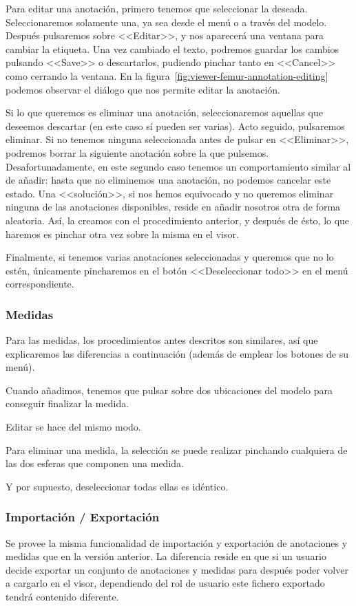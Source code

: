 Para editar una anotación, primero tenemos que seleccionar la deseada. Seleccionaremos solamente una, ya sea desde el menú o a través del modelo. Después pulsaremos sobre <<Editar>>, y nos aparecerá una ventana para cambiar la etiqueta. Una vez cambiado el texto, podremos guardar los cambios pulsando <<Save>> o descartarlos, pudiendo pinchar tanto en <<Cancel>> como cerrando la ventana.
En la figura~\ref{fig:viewer-femur-annotation-editing} podemos observar el diálogo que nos permite editar la anotación.

Si lo que queremos es eliminar una anotación, seleccionaremos aquellas que deseemos descartar (en este caso sí pueden ser varias). Acto seguido, pulsaremos eliminar. Si no tenemos ninguna seleccionada antes de pulsar en <<Eliminar>>, podremos borrar la siguiente anotación sobre la que pulsemos. Desafortunadamente, en este segundo caso tenemos un comportamiento similar al de añadir: hasta que no eliminemos una anotación, no podemos cancelar este estado. Una <<solución>>, si nos hemos equivocado y no queremos eliminar ninguna de las anotaciones disponibles, reside en añadir nosotros otra de forma aleatoria. Así, la creamos con el procedimiento anterior, y después de ésto, lo que haremos es pinchar otra vez sobre la misma en el visor.

Finalmente, si tenemos varias anotaciones seleccionadas y queremos que no lo estén, únicamente pincharemos en el botón <<Deseleccionar todo>> en el menú correspondiente.

\subsubsection{Medidas}
Para las medidas, los procedimientos antes descritos son similares, así que explicaremos las diferencias a continuación (además de emplear los botones de su menú).

Cuando añadimos, tenemos que pulsar sobre dos ubicaciones del modelo para conseguir finalizar la medida.

Editar se hace del mismo modo.

Para eliminar una medida, la selección se puede realizar pinchando cualquiera de las dos esferas que componen una medida.

Y por supuesto, deseleccionar todas ellas es idéntico.

\subsubsection{Importación / Exportación}\label{sec:import-export}
Se provee la misma funcionalidad de importación y exportación de anotaciones y medidas que en la versión anterior. La diferencia reside en que si un usuario decide exportar un conjunto de anotaciones y medidas para después poder volver a cargarlo en el visor, dependiendo del rol de usuario este fichero exportado tendrá contenido diferente.

